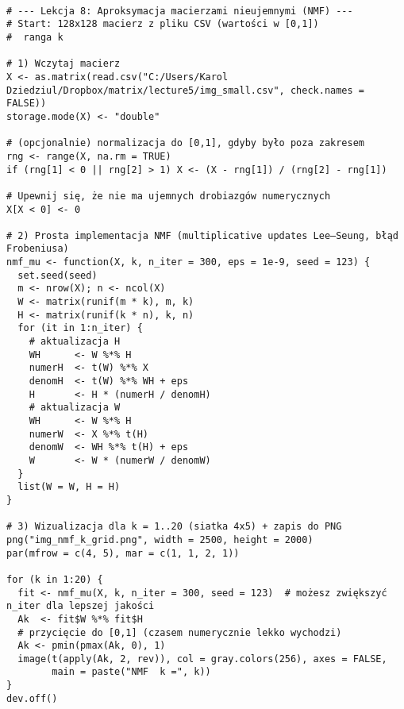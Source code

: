 \documentclass[12pt]{article}
\begin{document}
\begin{lstlisting}

# --- Lekcja 8: Aproksymacja macierzami nieujemnymi (NMF) ---
# Start: 128x128 macierz z pliku CSV (wartości w [0,1])
#  ranga k

# 1) Wczytaj macierz
X <- as.matrix(read.csv("C:/Users/Karol Dziedziul/Dropbox/matrix/lecture5/img_small.csv", check.names = FALSE))
storage.mode(X) <- "double"

# (opcjonalnie) normalizacja do [0,1], gdyby było poza zakresem
rng <- range(X, na.rm = TRUE)
if (rng[1] < 0 || rng[2] > 1) X <- (X - rng[1]) / (rng[2] - rng[1])

# Upewnij się, że nie ma ujemnych drobiazgów numerycznych
X[X < 0] <- 0

# 2) Prosta implementacja NMF (multiplicative updates Lee–Seung, błąd Frobeniusa)
nmf_mu <- function(X, k, n_iter = 300, eps = 1e-9, seed = 123) {
  set.seed(seed)
  m <- nrow(X); n <- ncol(X)
  W <- matrix(runif(m * k), m, k)
  H <- matrix(runif(k * n), k, n)
  for (it in 1:n_iter) {
    # aktualizacja H
    WH      <- W %*% H
    numerH  <- t(W) %*% X
    denomH  <- t(W) %*% WH + eps
    H       <- H * (numerH / denomH)
    # aktualizacja W
    WH      <- W %*% H
    numerW  <- X %*% t(H)
    denomW  <- WH %*% t(H) + eps
    W       <- W * (numerW / denomW)
  }
  list(W = W, H = H)
}

# 3) Wizualizacja dla k = 1..20 (siatka 4x5) + zapis do PNG
png("img_nmf_k_grid.png", width = 2500, height = 2000)
par(mfrow = c(4, 5), mar = c(1, 1, 2, 1))

for (k in 1:20) {
  fit <- nmf_mu(X, k, n_iter = 300, seed = 123)  # możesz zwiększyć n_iter dla lepszej jakości
  Ak  <- fit$W %*% fit$H
  # przycięcie do [0,1] (czasem numerycznie lekko wychodzi)
  Ak <- pmin(pmax(Ak, 0), 1)
  image(t(apply(Ak, 2, rev)), col = gray.colors(256), axes = FALSE,
        main = paste("NMF  k =", k))
}
dev.off()




\end{lstlisting}
\end{document}
